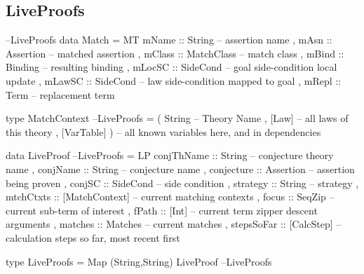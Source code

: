 \subsection{LiveProofs}

\begin{code}                                                      --LiveProofs
data Match
 = MT { mName  ::  String     -- assertion name
      , mAsn   ::  Assertion  -- matched assertion
      , mClass ::  MatchClass -- match class
      , mBind  ::  Binding    -- resulting binding
      , mLocSC ::  SideCond   -- goal side-condition local update
      , mLawSC ::  SideCond   -- law side-condition mapped to goal
      , mRepl  ::  Term       -- replacement term
      }
\end{code}

\begin{code}
type MatchContext                                                 --LiveProofs
  = ( String       -- Theory Name
    , [Law]        -- all laws of this theory
    , [VarTable] ) -- all known variables here, and in dependencies
\end{code}

\begin{code}
data LiveProof                                                    --LiveProofs
  = LP {
      conjThName :: String -- conjecture theory name
    , conjName :: String -- conjecture name
    , conjecture :: Assertion -- assertion being proven
    , conjSC :: SideCond -- side condition
    , strategy :: String -- strategy
    , mtchCtxts :: [MatchContext] -- current matching contexts
    , focus :: SeqZip  -- current sub-term of interest
    , fPath :: [Int] -- current term zipper descent arguments
    , matches :: Matches -- current matches
    , stepsSoFar :: [CalcStep]  -- calculation steps so far, most recent first
    }
\end{code}

\begin{code}
type LiveProofs = Map (String,String) LiveProof                   --LiveProofs
\end{code}
